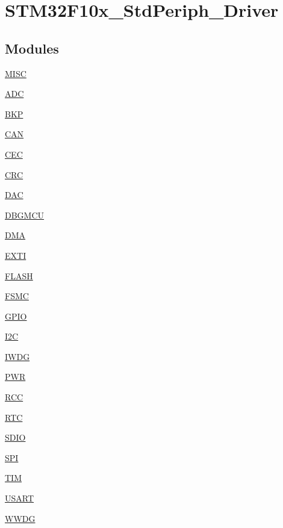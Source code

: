 \hypertarget{group__STM32F10x__StdPeriph__Driver}{
\section{STM32F10x\_\-StdPeriph\_\-Driver}
\label{group__STM32F10x__StdPeriph__Driver}
}
\subsection*{Modules}
\begin{DoxyCompactItemize}
\item 
\hyperlink{group__MISC}{MISC}
\item 
\hyperlink{group__ADC}{ADC}
\item 
\hyperlink{group__BKP}{BKP}
\item 
\hyperlink{group__CAN}{CAN}
\item 
\hyperlink{group__CEC}{CEC}
\item 
\hyperlink{group__CRC}{CRC}
\item 
\hyperlink{group__DAC}{DAC}
\item 
\hyperlink{group__DBGMCU}{DBGMCU}
\item 
\hyperlink{group__DMA}{DMA}
\item 
\hyperlink{group__EXTI}{EXTI}
\item 
\hyperlink{group__FLASH}{FLASH}
\item 
\hyperlink{group__FSMC}{FSMC}
\item 
\hyperlink{group__GPIO}{GPIO}
\item 
\hyperlink{group__I2C}{I2C}
\item 
\hyperlink{group__IWDG}{IWDG}
\item 
\hyperlink{group__PWR}{PWR}
\item 
\hyperlink{group__RCC}{RCC}
\item 
\hyperlink{group__RTC}{RTC}
\item 
\hyperlink{group__SDIO}{SDIO}
\item 
\hyperlink{group__SPI}{SPI}
\item 
\hyperlink{group__TIM}{TIM}
\item 
\hyperlink{group__USART}{USART}
\item 
\hyperlink{group__WWDG}{WWDG}
\end{DoxyCompactItemize}
